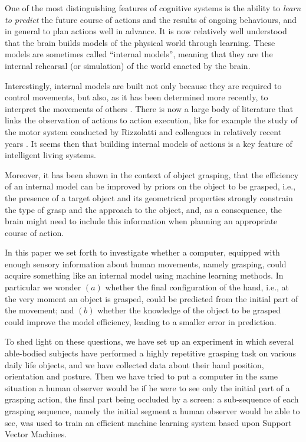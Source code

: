 One of the most distinguishing features of cognitive systems is the
ability to \emph{learn to predict} the future course of actions and
the results of ongoing behaviours, and in general to plan actions well
in advance. It is now relatively well understood that the brain builds
models of the physical world through learning. These models are
sometimes called ``internal models'', meaning that they are the
internal rehearsal (or simulation) of the world enacted by the brain.

Interestingly, internal models are built not only because they are
required to control movements, but also, as it has been determined
more recently, to interpret the movements of others \cite{kawato-99,
wolpert-03, mussaivaldi-00, lackner-98}. There is now a large body of
literature that links the observation of actions to action execution,
like for example the study of the motor system conducted by Rizzolatti
and colleagues in relatively recent years
\cite{rizzolatti-04,gallese-96,rizzolatti-01}. It seems then that
building internal models of actions is a key feature of intelligent
living systems.

Moreover, it has been shown in the context of object grasping, that
the efficiency of an internal model can be improved by priors on the
object to be grasped, i.e., the presence of a target object and its
geometrical properties strongly constrain the type of grasp and the
approach to the object, and, as a consequence, the brain might need to
include this information when planning an appropriate course of
action.

In this paper we set forth to investigate whether a computer, equipped
with enough sensory information about human movements, namely
grasping, could acquire something like an internal model using machine
learning methods. In particular we wonder $(a)$ whether the final
configuration of the hand, i.e., at the very moment an object is
grasped, could be predicted from the initial part of the movement; and
$(b)$ whether the knowledge of the object to be grasped could improve
the model efficiency, leading to a smaller error in prediction.

To shed light on these questions, we have set up an experiment in
which several able-bodied subjects have performed a highly repetitive
grasping task on various daily life objects, and we have collected
data about their hand position, orientation and posture. Then we have
tried to put a computer in the same situation a human observer would
be if he were to see only the initial part of a grasping action, the
final part being occluded by a screen: a sub-sequence of each grasping
sequence, namely the initial segment a human observer would be able to
see, was used to train an efficient machine learning system based upon
Support Vector Machines.

